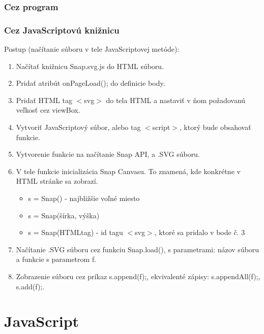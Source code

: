  \subsubsection{Cez program}
 
 \subsubsection{Cez JavaScriptovú knižnicu}

Postup (načítanie súboru v tele JavaScriptovej metóde): 
\begin{enumerate}
	\item Načítať knižnicu Snap.svg.js do HTML súboru. 
	\item Pridať atribút onPageLoad(); do definicie body.
	\item Pridať HTML tag $<$svg$>$ do tela HTML a nastaviť v ňom požadovanú veľkosť cez viewBox.
	\item Vytvoriť JavaScriptový súbor, alebo tag $<$script$>$, ktorý bude obsahovať funkcie. 
	\item Vytvorenie funkcie na načítanie Snap API, a .SVG súboru. 
	\item V tele funkcie inicializácia Snap Canvasu. To znamená, kde konkrétne v HTML stránke sa zobrazí.
	\begin{itemize}
		\item s = Snap() - najbližšie voľné miesto
		\item s = Snap(šírka, výška) 
		\item s = Snap(HTMLtag) - id tagu $<$svg$>$, ktoré sa pridalo v bode č. 3
	\end{itemize}
	\item Načítanie .SVG súboru cez funkciu Snap.load(), s parametrami: názov súboru a funkcie s parametrom f. 
	\item Zobrazenie súboru cez príkaz s.append(f);, ekvivalenté zápisy: s.appendAll(f);, s.add(f);. 
	
	
\end{enumerate}













\section{JavaScript}











